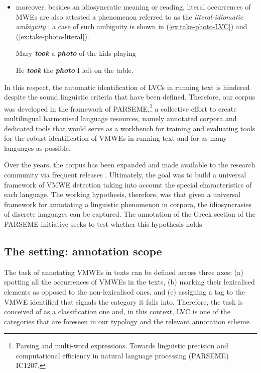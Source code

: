 \documentclass[output=paper,colorlinks,citecolor=brown]{langscibook}
\begin{document}
\begin{itemize}
  \item moreover, besides an idiosyncratic meaning or reading, literal occurrences of MWEs are also attested \textemdash a phenomenon referred to as the \textit{literal-idiomatic ambiguity} \citep{savary_etal_2019}; a case of such ambiguity is shown in (\ref{ex:take-photo-LVC}) and (\ref{ex:take-photo-literal}). 

 \ea
\label{ex:take-photo-LVC}
\settowidth {}
Mary \textbf{\em{took}} a \textbf{\em{photo}} of the kids playing
\z

\ea
\label{ex:take-photo-literal}
\settowidth {}
He \textbf{\em{took}} the \textbf{\em{photo}} I left on the table.
\z
    
\end{itemize}




In this respect, the automatic identification of LVCs in running text is hindered despite the sound linguistic criteria that have been defined. Therefore, our corpus was developed in the framework of PARSEME,\footnote{Parsing and multi-word expressions. Towards linguistic precision and computational efficiency in natural language processing (PARSEME) IC1207.} a collective effort to create multilingual harmonised language resources, namely annotated corpora and dedicated tools that would serve as a workbench for training and evaluating tools for the robust identification of VMWEs in running text \citep{savary_etal_2017} and for as many languages as possible. 


Over the years, the corpus has been expanded and made available to the research community via frequent releases \citep{Savary-et-al-PMWE-2018, ramisch_etal_2018, ramisch_etal_2020, savary-etal-2023-parseme}. Ultimately, the goal was to build a universal framework of VMWE detection taking into account the special characteristics of each language. The working hypothesis, therefore, was that given a universal framework for annotating a linguistic phenomenon in corpora, the idiosyncrasies of discrete languages can be captured. The annotation of the Greek section of the PARSEME initiative seeks to test whether this hypothesis holds.

\subsection{The setting: annotation scope}
\label{sec:PARSEMEScope}

The task of annotating VMWEs in texts can be defined across three axes: (a) spotting all the occurrences of VMWEs in the texts, (b) marking their lexicalised elements as opposed to the non-lexicalised ones, and (c) assigning a tag to the VMWE identified that signals the category it falls into. Therefore, the task is conceived of as a classification one and, in this context, LVC is one of the categories that are foreseen in our typology and the relevant annotation scheme.
\end{document}
